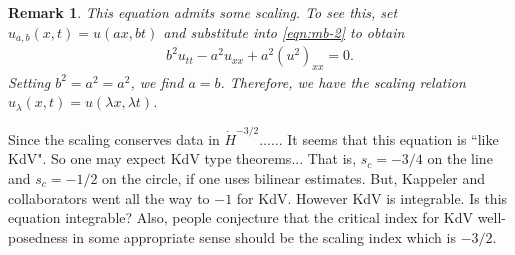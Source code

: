 \documentclass[12pt,reqno]{amsart}
\numberwithin{equation}{section}  %
\numberwithin{figure}{section}
\newtheorem{remark}[theorem]{Remark}
\begin{document}
        \begin{remark}
        This equation admits some scaling. To see this, set $u_{a,b}(x,t) =
        u(ax,bt)$ and substitute into \eqref{eqn:mb-2} to obtain
          \begin{equation*}
          \begin{split}
            b^{2}u_{tt} - a^{2}u_{xx} + a^{2}(u^{2})_{xx} = 0.
          \end{split}
          \end{equation*}
          Setting $b^{2} = a^{2} = a^{2}$, we
          find $a=b$. Therefore, we have the scaling relation
          $u_{\lambda}(x,t) = u(\lambda x, \lambda t)$. 
        \label{rem:}
        \end{remark}
        Since the scaling conserves data in $\dot{H}^{-3/2}$......
        It seems that this equation is ``like KdV".
        So one may expect KdV type theorems...
        That is, $s_c=-3/4$ on the line and $s_c=-1/2$ on the circle,
        if one uses bilinear estimates.
        But, Kappeler and collaborators went all the way to $-1$ for KdV.
        However KdV is integrable. Is this equation integrable?
        Also, people conjecture that the critical index for KdV well-posedness 
        in some appropriate sense should be the scaling index which is  $-3/2$.
        
        


\end{document}
